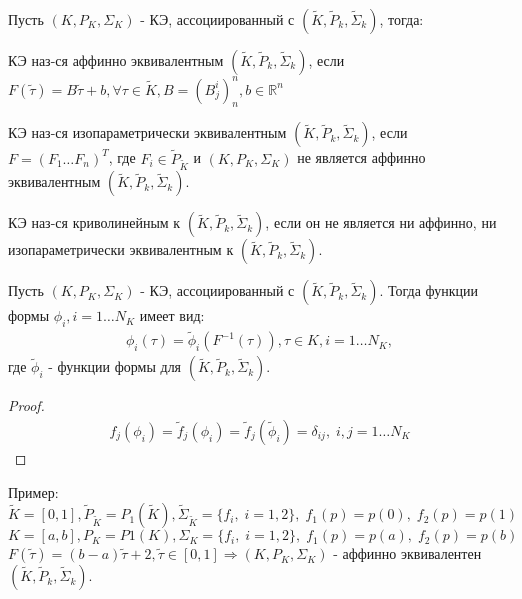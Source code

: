 \documentclass[__main__.tex]{subfiles}
\begin{document}
Пусть $(K,P_K,\Sigma_K)$ - КЭ, ассоциированный с $\left(\tilde{K},\tilde{P}_k,\tilde{\Sigma}_k\right)$, тогда:
\begin{definition}
	КЭ наз-ся аффинно эквивалентным $\left(\tilde{K},\tilde{P}_k,\tilde{\Sigma}_k\right)$, если $F(\tilde{\tau})=B\tilde{\tau}+b,\forall\tau\in\tilde{K},B=(B^i_j)^n_n,b\in\mathbb{R}^n$
\end{definition}
\begin{definition}
	КЭ наз-ся изопараметрически эквивалентным $\left(\tilde{K},\tilde{P}_k,\tilde{\Sigma}_k\right)$, если $F=(F_1\dots F_n)^T$, где $F_i\in\tilde{P}_{\tilde{K}}$ и $(K,P_K,\Sigma_K)$ не является аффинно эквивалентным $\left(\tilde{K},\tilde{P}_k,\tilde{\Sigma}_k\right)$.
\end{definition}
\begin{definition}[Криволинейный КЭ]
	КЭ наз-ся криволинейным к $\left(\tilde{K},\tilde{P}_k,\tilde{\Sigma}_k\right)$, если он не является ни аффинно, ни изопараметрически эквивалентным к $\left(\tilde{K},\tilde{P}_k,\tilde{\Sigma}_k\right)$.
\end{definition}
\begin{theorem}
	Пусть $(K,P_K,\Sigma_K)$ - КЭ, ассоциированный с $\left(\tilde{K},\tilde{P}_k,\tilde{\Sigma}_k\right)$. Тогда функции формы $\phi_i,i=1\dots N_K$ имеет вид:
	\begin{gather*}
		\phi_i(\tau)=\tilde{\phi}_i(F^{-1}(\tau)),\tau\in K,i=1\dots N_K,
	\end{gather*}
	где $\tilde{\phi}_i$ - функции формы для $\left(\tilde{K},\tilde{P}_k,\tilde{\Sigma}_k\right)$.
\end{theorem}
\begin{proof}
	\begin{gather*}
		f_j(\phi_i)=\tilde{f}_j(\phi_i)=\tilde{f}_j(\tilde{\phi}_i)=\delta_{ij},\;i,j=1\dots N_K
	\end{gather*}
\end{proof}
Пример:\\
$\tilde{K}=[0,1],\tilde{P}_{\tilde{K}}=P_1(\tilde{K}),\tilde{\Sigma}_{\tilde{K}}=\{f_i,\;i=1,2 \},\;f_1(p)=p(0),\;f_2(p)=p(1)$\\
$K=[a,b],P_K=P1(K),\Sigma_K=\{f_i,\;i=1,2 \},\;f_1(p)=p(a),\;f_2(p)=p(b)$\\
$F(\tilde{\tau})=(b-a)\tilde{\tau}+2,\tilde{\tau}\in[0,1]\Rightarrow(K,P_K,\Sigma_K)$ - аффинно эквивалентен $\left(\tilde{K},\tilde{P}_k,\tilde{\Sigma}_k\right)$.
\end{document}
